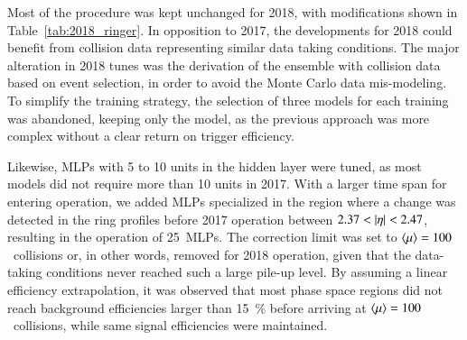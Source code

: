 Most of the procedure was kept unchanged for 2018, with modifications shown in
Table~\ref{tab:2018_ringer}.
In opposition to 2017, the developments for 2018
could benefit from collision data 
representing similar data taking conditions.
The major alteration in 2018 tunes was the derivation of the \rnn{} ensemble with collision data based on \Zee{} \tnp{} event selection, in order to avoid the Monte Carlo data mis-modeling.
To simplify the training strategy, the selection of three models for each training was abandoned, keeping only the \spmax{} model, as the previous approach was more complex without a clear return on trigger efficiency. 

Likewise, MLPs with 5 to 10 units in the hidden layer were tuned, as most models did not require
more than 10 units in 2017. With a larger time span for entering operation, we
added MLPs specialized in the region where a change was detected in the ring
profiles before 2017 operation between $2.37<\abseta<2.47$, resulting in the operation of
\SI{25}{MLPs}. The correction limit was set to
$\langle \mu \rangle{}=100$~collisions or, in other words, removed for 2018 operation, given
that the data-taking 
conditions never reached such a large pile-up level. By
assuming a linear efficiency extrapolation, 
it was observed that most phase space regions did not reach background efficiencies
larger than \SI{15}{\%} before arriving at $\langle \mu \rangle=100$~collisions, while same
signal efficiencies were maintained.






